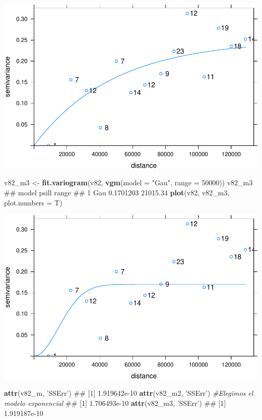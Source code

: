\documentclass[11pt,]{article}
\newenvironment{Shaded}{\begin{snugshade}}{\end{snugshade}}
\newcommand{\KeywordTok}[1]{\textcolor[rgb]{0.13,0.29,0.53}{\textbf{#1}}}
\newcommand{\DataTypeTok}[1]{\textcolor[rgb]{0.13,0.29,0.53}{#1}}
\newcommand{\DecValTok}[1]{\textcolor[rgb]{0.00,0.00,0.81}{#1}}
\newcommand{\StringTok}[1]{\textcolor[rgb]{0.31,0.60,0.02}{#1}}
\newcommand{\CommentTok}[1]{\textcolor[rgb]{0.56,0.35,0.01}{\textit{#1}}}
\newcommand{\NormalTok}[1]{#1}
\begin{document}
\includegraphics[width=1\linewidth]{img/unnamed-chunk-15-2}

\begin{Shaded}
\begin{Highlighting}[]

\NormalTok{v82_m3 <-}\StringTok{ }\KeywordTok{fit.variogram}\NormalTok{(v82, }\KeywordTok{vgm}\NormalTok{(}\DataTypeTok{model =} \StringTok{"Gau"}\NormalTok{, }\DataTypeTok{range =} \DecValTok{50000}\NormalTok{))}
\NormalTok{v82_m3}
\NormalTok{##   model     psill    range}
\NormalTok{## 1   Gau 0.1701203 21015.34}
\KeywordTok{plot}\NormalTok{(v82, v82_m3, }\DataTypeTok{plot.numbers =}\NormalTok{ T)}
\end{Highlighting}
\end{Shaded}

\includegraphics[width=1\linewidth]{img/unnamed-chunk-15-3}

\begin{Shaded}
\begin{Highlighting}[]

\KeywordTok{attr}\NormalTok{(v82_m, }\StringTok{'SSErr'}\NormalTok{)}
\NormalTok{## [1] 1.919642e-10}
\KeywordTok{attr}\NormalTok{(v82_m2, }\StringTok{'SSErr'}\NormalTok{)               }\CommentTok{#Elegimos el modelo exponencial}
\NormalTok{## [1] 1.706493e-10}
\KeywordTok{attr}\NormalTok{(v82_m3, }\StringTok{'SSErr'}\NormalTok{)}
\NormalTok{## [1] 1.919187e-10}
\end{Highlighting}
\end{Shaded}
\end{document}

